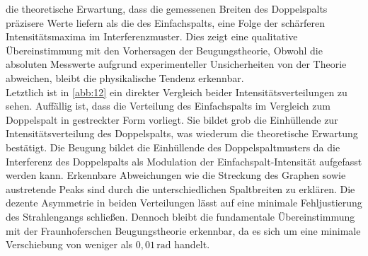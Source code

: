 die theoretische Erwartung, dass die gemessenen Breiten des Doppelspalts präzisere
Werte liefern als die des Einfachspalts, eine Folge der schärferen 
Intensitätsmaxima im Interferenzmuster. Dies zeigt eine qualitative
Übereinstimmung mit den Vorhersagen der Beugungstheorie, Obwohl die absoluten 
Messwerte aufgrund experimenteller Unsicherheiten von der Theorie abweichen,
bleibt die physikalische Tendenz erkennbar.
\\
\noindent Letztlich ist in \autoref{abb:12} ein direkter Vergleich beider 
Intensitätsverteilungen zu sehen. Auffällig ist, dass die Verteilung des 
Einfachspalts im Vergleich zum Doppelspalt in gestreckter Form vorliegt. Sie 
bildet grob die Einhüllende zur Intensitätsverteilung des Doppelspalts, 
was wiederum die theoretische Erwartung bestätigt. Die Beugung bildet die 
Einhüllende des Doppelspaltmusters da die Interferenz des Doppelspalts als 
Modulation der Einfachspalt-Intensität aufgefasst werden kann. Erkennbare 
Abweichungen wie die Streckung des Graphen sowie austretende Peaks sind durch 
die unterschiedlichen Spaltbreiten zu erklären. Die dezente Asymmetrie in beiden
Verteilungen lässt auf eine minimale Fehljustierung des Strahlengangs schließen.
Dennoch bleibt die fundamentale Übereinstimmung mit der Fraunhoferschen
Beugungstheorie erkennbar, da es sich um eine minimale Verschiebung von weniger 
als $0,01\,\text{rad}$ handelt.